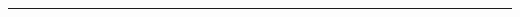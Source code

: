\documentclass[usenames,dvipsnames,t]{beamer}
\newcommand{\R}{\mathbb{R}}
\begin{document}
\hrule height 5pt



%             



\end{document}
